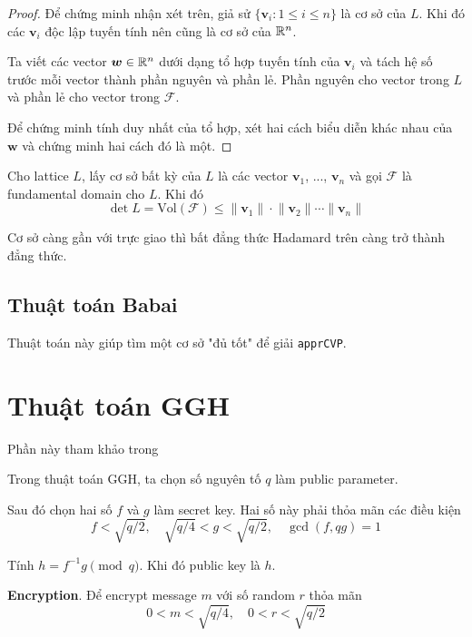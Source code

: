 \begin{proof}
    Để chứng minh nhận xét trên, giả sử $\{ \bm{v}_i : 1 \leqslant i \leqslant n \}$ là cơ sở của $L$. Khi đó các $\bm{v}_i$ độc lập tuyến tính nên cũng là cơ sở của $\mathbb{R}^n$.

    Ta viết các vector $\bm{w} \in \mathbb{R}^n$ dưới dạng tổ hợp tuyến tính của $\bm{v}_i$ và tách hệ số trước mỗi vector thành phần nguyên và phần lẻ. Phần nguyên cho vector trong $L$ và phần lẻ cho vector trong $\mathcal{F}$.

    Để chứng minh tính duy nhất của tổ hợp, xét hai cách biểu diễn khác nhau của $\bm{w}$ và chứng minh hai cách đó là một.
\end{proof}

\begin{theorem}
    Cho lattice $L$, lấy cơ sở bất kỳ của $L$ là các vector $\bm{v}_1$, ..., $\bm{v}_n$ và gọi $\mathcal{F}$ là fundamental domain cho $L$. Khi đó
    \begin{equation}
        \det L = \text{Vol} (\mathcal{F}) \leqslant \lVert \bm{v}_1 \rVert \cdot \lVert \bm{v}_2 \rVert \cdots \lVert \bm{v}_n \rVert
    \end{equation}
\end{theorem}

Cơ sở càng gần với trực giao thì bất đẳng thức Hadamard trên càng trở thành đẳng thức.

\subsection*{Thuật toán Babai}

Thuật toán này giúp tìm một cơ sở "đủ tốt" để giải \texttt{apprCVP}.

\section{Thuật toán GGH}

Phần này tham khảo trong \cite{HofJef-2014}

Trong thuật toán GGH, ta chọn số nguyên tố $q$ làm public parameter.

Sau đó chọn hai số $f$ và $g$ làm secret key. Hai số này phải thỏa mãn các điều kiện \[ f < \sqrt{q/2}, \quad \sqrt{q/4} < g < \sqrt{q/2}, \quad \gcd(f, qg) = 1 \]

Tính $h = f^{-1} g \pmod q$. Khi đó public key là $h$.

\textbf{Encryption}. Để encrypt message $m$ với số random $r$ thỏa mãn \[ 0 < m < \sqrt{q/4}, \quad 0 < r < \sqrt{q/2} \]

